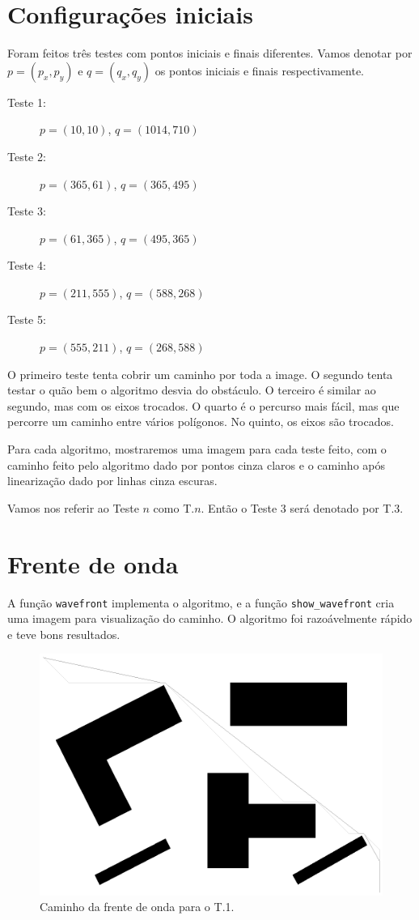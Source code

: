 \documentclass[12pt]{article}
\theoremstyle{plain}
\numberwithin{equation}{section}
\newcommand{\code}[1]{\lstinline[mathescape=true]{#1}}
\begin{document}
\section{Configurações iniciais}

Foram feitos três testes com pontos iniciais e finais diferentes. Vamos denotar por $p=(p_x,p_y)$
e $q=(q_x,q_y)$ os pontos iniciais e finais respectivamente.

\begin{description}
  \item[Teste 1:] $p=(10, 10)$, $q=(1014, 710)$
  \item[Teste 2:] $p=(365, 61)$, $q=(365, 495)$
  \item[Teste 3:] $p=(61, 365)$, $q=(495, 365)$
  \item[Teste 4:] $p=(211, 555)$, $q=(588, 268)$
  \item[Teste 5:] $p=(555, 211)$, $q=(268, 588)$
\end{description}

O primeiro teste tenta cobrir um caminho por toda a image. O segundo tenta testar o quão bem o
algoritmo desvia do obstáculo. O terceiro é similar ao segundo, mas com os eixos trocados. O quarto
é o percurso mais fácil, mas que percorre um caminho entre vários polígonos. No quinto, os eixos
são trocados.

Para cada algoritmo, mostraremos uma imagem para cada teste feito, com o caminho feito pelo
algoritmo dado por pontos cinza claros e o caminho após linearização dado por linhas cinza escuras.

Vamos nos referir ao Teste $n$ como T.$n$. Então o Teste 3 será denotado por T.3.

\section{Frente de onda}

A função \code{wavefront} implementa o algoritmo, e a função \code{show_wavefront} cria uma imagem
para visualização do caminho. O algoritmo foi razoávelmente rápido e teve bons resultados.

\begin{figure}[H]
  \centering\includegraphics[scale=0.4]{imgs/wavefront_path_1.png}
  \caption{Caminho da frente de onda para o T.1.}
\end{figure}
\end{document}
